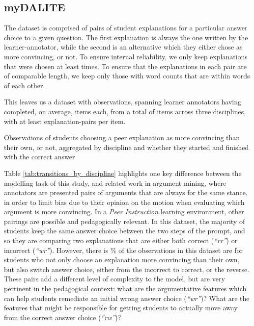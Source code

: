 \documentclass[runningheads]{llncs}
\begin{document}
\subsection{myDALITE}
The dataset is comprised of pairs of student explanations for a particular 
answer choice to a given question. 
The first explanation is always the one written by the learner-annotator, while 
the second is an alternative which they either chose as more convincing, or 
not. 
To ensure internal reliability, we only keep explanations that were chosen at 
least times. 
To ensure that the explanations in each pair are of comparable length, we keep 
only those with word counts that are within 
words of each other. 

This leaves us a dataset with observations, 
spanning learner annotators having 
completed, on average, 
items each, from a total of 
items across three disciplines, 
with at least 
explanation-pairs 
per item.


\begin{table}
	\caption{Observations of students choosing a peer explanation as 
		more 
		convincing than their own, or not, aggregated by discipline and whether 
		they 
		started and finished with the correct answer}
	
	
	
	\label{tab:transitions_by_discipline}
\end{table}

Table \ref{tab:transitions_by_discipline} highlights one key difference between 
the modelling task of this study, and related work in argument mining, where 
annotators are presented pairs of arguments that are always for the same 
stance, in order to limit bias due to their opinion on the motion when 
evaluating which argument is more convincing.
In a \textit{Peer Instruction} learning environment, other pairings are 
possible and pedagogically relevant. 
In this dataset, the majority of students keep the same answer choice between 
the two steps of the prompt, and so they are comparing two explanations that 
are either both correct (\textit{``rr''}) or incorrect (\textit{``wr''}). 
However, there is \% of the 
observations in this dataset are for students who not only choose an 
explanation more convincing than their own, but also switch answer choice, 
either from the incorrect to correct, or the reverse. 
These pairs add a different level of complexity to the model, but are very 
pertinent in the pedagogical context: what are the argumentative features which 
can help students remediate an initial wrong answer choice (\textit{``wr''})?
What are the features that might be responsible for getting students to 
actually move away from the correct answer choice (\textit{``rw''})?
\end{document}
